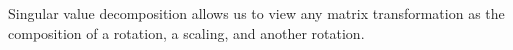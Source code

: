\documentclass{article}
\begin{document}
Singular value decomposition allows us to view any matrix transformation as the composition of 
a rotation, a scaling, and another rotation.
\end{document}
